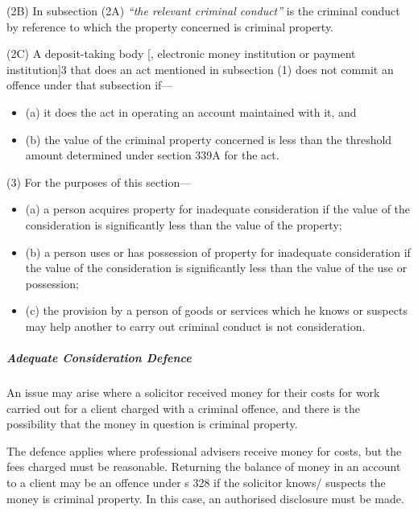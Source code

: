 \documentclass[
]{article}
\newenvironment{env-28b706cc-8a08-422f-af86-ede86c79505b}
{
    \savenotes\tcolorbox[blanker,breakable,left=5pt,borderline west={2pt}{-4pt}{green}]
}
{
    \endtcolorbox\spewnotes
}
\begin{document}
\begin{env-28b706cc-8a08-422f-af86-ede86c79505b}
(2B) In subsection (2A) \emph{``the relevant criminal conduct''} is the
criminal conduct by reference to which the property concerned is
criminal property.

(2C) A deposit-taking body {[}, electronic money institution or payment
institution{]}3 that does an act mentioned in subsection (1) does not
commit an offence under that subsection if---

\begin{itemize}
\item
  (a) it does the act in operating an account maintained with it, and
\item
  (b) the value of the criminal property concerned is less than the
  threshold amount determined under section 339A for the act.
\end{itemize}

(3) For the purposes of this section---

\begin{itemize}
\item
  (a) a person acquires property for inadequate consideration if the
  value of the consideration is significantly less than the value of the
  property;
\item
  (b) a person uses or has possession of property for inadequate
  consideration if the value of the consideration is significantly less
  than the value of the use or possession;
\item
  (c) the provision by a person of goods or services which he knows or
  suspects may help another to carry out criminal conduct is not
  consideration.
\end{itemize}

\end{env-28b706cc-8a08-422f-af86-ede86c79505b}

\hypertarget{adequate-consideration-defence}{%
\subparagraph{Adequate Consideration
Defence}\label{adequate-consideration-defence}}

An issue may arise where a solicitor received money for their costs for
work carried out for a client charged with a criminal offence, and there
is the possibility that the money in question is criminal property.

The defence applies where professional advisers receive money for costs,
but the fees charged must be reasonable. Returning the balance of money
in an account to a client may be an offence under s 328 if the solicitor
knows/ suspects the money is criminal property. In this case, an
authorised disclosure must be made.
\end{document}
